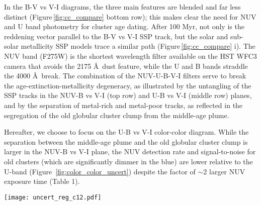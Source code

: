 \documentclass[linenumbers]{aastex63}
\begin{document}
{In the B-V vs V-I diagrams, the three main features are blended and far less distinct (Figure\,\ref{fig:cc_compare} bottom row); this makes clear the need for NUV and U band photometry for cluster age dating.  
After 100 Myr, not only is the reddening vector parallel to the B-V vs V-I SSP track, but the solar and sub-solar metallicity SSP models trace a similar path (Figure\,\ref{fig:cc_compare} i).  The NUV band (F275W) is the shortest wavelength filter available on the HST WFC3 camera that avoids the 2175 \AA\ dust feature, while the U and B bands straddle the 4000 \AA\ break.  The combination of the NUV-U-B-V-I filters serve to break the age-extinction-metallicity degeneracy, as illustrated by the untangling of the SSP tracks in the NUV-B vs V-I (top row) and U-B vs V-I (middle row) planes, and by the separation of metal-rich and metal-poor tracks, as reflected in the segregation of the old globular cluster clump from the middle-age plume. 

Hereafter, we choose to focus on the U-B vs V-I color-color diagram.  While the separation between the middle-age plume and the old globular cluster clump is larger in the NUV-B vs V-I plane, the NUV detection rate and signal-to-noise for old clusters (which are significantly dimmer in the blue) are lower relative to the U-band (Figure~\ref{fig:color_color_uncert}) despite the factor of $\sim2$ larger NUV exposure time (Table 1).

\begin{figure*} 
\texttt{[image: uncert\_reg\_c12.pdf]}
 \caption{Mean color uncertainties for the NUV-B vs V-I (top row) and U-B vs V-I (bottom row) diagrams. We present class 1+2 clusters for ML (left two panels) and human classifications (right two panels) separately. %
 The maps show the mean uncertainty in each bin, and only bins with at least 5 clusters are displayed. }
 \label{fig:color_color_uncert}
\end{figure*}


}
\end{document}
